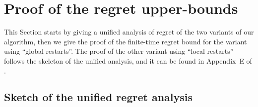 \section{Proof of the regret upper-bounds}
\label{sec:6:proofRegret}

This Section starts by giving a unified analysis of regret of the two variants of our algorithm, then we give the proof of the finite-time regret bound for the variant using ``global restarts''.
The proof of the other variant using ``local restarts'' follows the skeleton of the unified analysis, and it can be found in Appendix~E of \cite{Besson2019GLRT}.

\subsection{Sketch of the unified regret analysis}
\label{sub:6:proofSkeleton}

